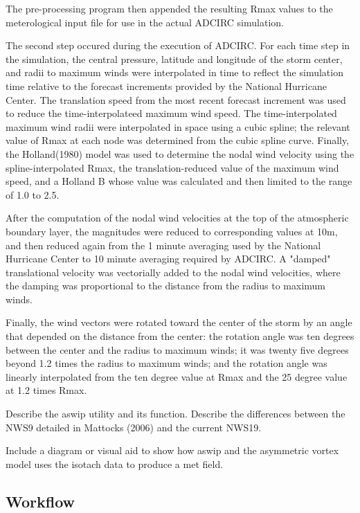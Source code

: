 \documentclass[jmse,article,submit,moreauthors,pdftex,12pt,a4paper]{mdpi}
\begin{document}
The pre-processing program then appended the resulting Rmax values 
to the meterological input file for use in the actual ADCIRC 
simulation.

The second step occured during the execution of ADCIRC. For each 
time step in the simulation, the central pressure, latitude and 
longitude of the storm center, and radii to maximum winds were 
interpolated in time to reflect the simulation time relative to the 
forecast increments provided by the National Hurricane Center. The 
translation speed from the most recent forecast increment was used 
to reduce the time-interpolateed maximum wind speed. The 
time-interpolated maximum wind radii were interpolated in space 
using a cubic spline; the relevant value of Rmax at each node was 
determined from the cubic spline curve. Finally, the Holland(1980) 
model was used to determine the nodal wind velocity using the 
spline-interpolated Rmax, the translation-reduced value of the 
maximum wind speed, and a Holland B whose value was calculated and 
then limited to the range of 1.0 to 2.5.

After the computation of the nodal wind velocities at the top of the 
atmospheric boundary layer, the magnitudes were reduced to 
corresponding values at 10m, and then reduced again from the 1 
minute averaging used by the National Hurricane Center to 10 minute 
averaging required by ADCIRC. A "damped" translational velocity was 
vectorially added to the nodal wind velocities, where the damping 
was proportional to the distance from the radius to maximum winds.

Finally, the wind vectors were rotated toward the center of the 
storm by an angle that depended on the distance from the center: the 
rotation angle was ten degrees between the center and the radius to 
maximum winds; it was twenty five degrees beyond 1.2 times the 
radius to maximum winds; and the rotation angle was linearly 
interpolated from the ten degree value at Rmax and the 25 degree 
value at 1.2 times Rmax.

Describe the aswip utility and its function. Describe the 
differences between the NWS9 detailed in Mattocks (2006) and the 
current NWS19. 

Include a diagram or visual aid to show how aswip and the asymmetric 
vortex model uses the isotach data to produce a met field. 


\subsection{Workflow}
\end{document}
